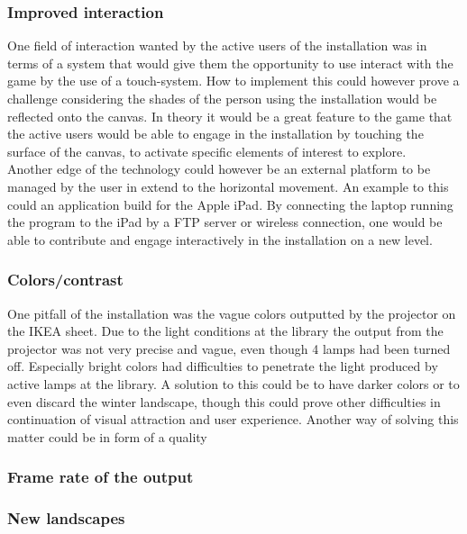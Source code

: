 \subsubsection{Improved interaction}
One field of interaction wanted by the active users of the installation was in terms of a system that would give them the opportunity to use interact with the game by the use of a touch-system. How to implement this could however prove a challenge considering the shades of the person using the installation would be reflected onto the canvas. In theory it would be a great feature to the game that the active users would be able to engage in the installation by touching the surface of the canvas, to activate specific elements of interest to explore.\\
Another edge of the technology could however be an external platform to be managed by the user in extend to the horizontal movement. An example to this could an application build for the Apple iPad. By connecting the laptop running the program to the iPad by a FTP server or wireless connection, one would be able to contribute and engage interactively in the installation on a new level.
\subsubsection{Colors/contrast}
One pitfall of the installation was the vague colors outputted by the projector on the IKEA sheet. Due to the light conditions at the library the output from the projector was not very precise and vague, even though 4 lamps had been turned off. Especially bright colors had difficulties to penetrate the light produced by active lamps at the library. A solution to this could be to have darker colors or to even discard the winter landscape, though this could prove other difficulties in continuation of visual attraction and user experience. Another way of solving this matter could be in form of a quality 
\subsubsection{Frame rate of the output}
\subsubsection{New landscapes}  
 




